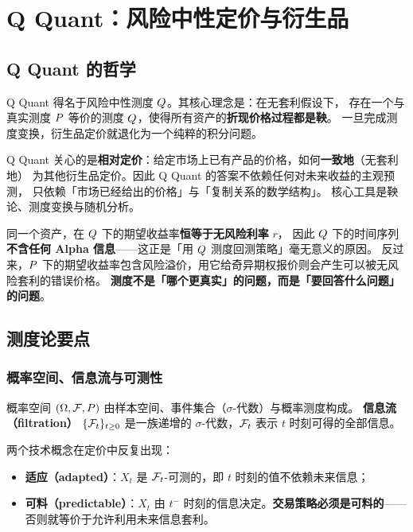 \chapter{Q Quant：风险中性定价与衍生品}

\section{Q Quant 的哲学}

Q Quant 得名于风险中性测度 $Q$。其核心理念是：在无套利假设下，
存在一个与真实测度 $P$ 等价的测度 $Q$，使得所有资产的\textbf{折现价格过程都是鞅}。
一旦完成测度变换，衍生品定价就退化为一个纯粹的积分问题。

\begin{keybox}
Q Quant 关心的是\textbf{相对定价}：给定市场上已有产品的价格，如何\textbf{一致地}（无套利地）
为其他衍生品定价。因此 Q Quant 的答案不依赖任何对未来收益的主观预测，
只依赖「市场已经给出的价格」与「复制关系的数学结构」。
核心工具是鞅论、测度变换与随机分析。
\end{keybox}

\begin{intuitionbox}
同一个资产，在 $Q$ 下的期望收益率\textbf{恒等于无风险利率} $r$，
因此 $Q$ 下的时间序列\textbf{不含任何 Alpha 信息}——这正是「用 $Q$ 测度回测策略」毫无意义的原因。
反过来，$P$ 下的期望收益率包含风险溢价，用它给奇异期权报价则会产生可以被无风险套利的错误价格。
\textbf{测度不是「哪个更真实」的问题，而是「要回答什么问题」的问题}。
\end{intuitionbox}

\section{测度论要点}

\subsection{概率空间、信息流与可测性}

概率空间 $(\Omega,\mathcal{F},P)$ 由样本空间、事件集合（$\sigma$-代数）与概率测度构成。
\textbf{信息流（filtration）} $\{\mathcal{F}_t\}_{t\ge0}$ 是一族递增的 $\sigma$-代数，$\mathcal{F}_t$ 表示 $t$ 时刻可得的全部信息。

两个技术概念在定价中反复出现：

\begin{itemize}[leftmargin=1.8em]
  \item \textbf{适应（adapted）}：$X_t$ 是 $\mathcal{F}_t$-可测的，即 $t$ 时刻的值不依赖未来信息；
  \item \textbf{可料（predictable）}：$X_t$ 由 $t^-$ 时刻的信息决定。\textbf{交易策略必须是可料的}——
        否则就等价于允许利用未来信息套利。
\end{itemize}

